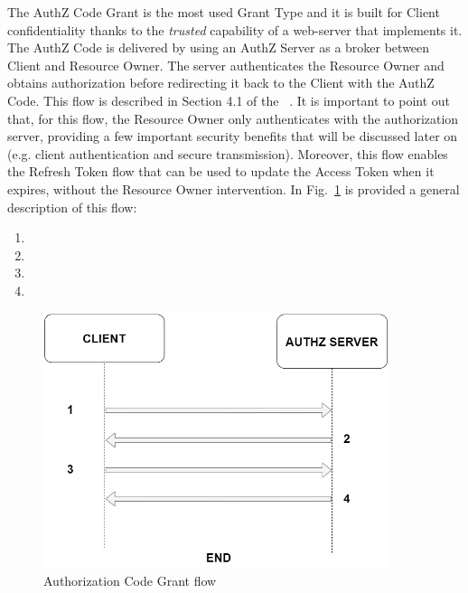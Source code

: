 The AuthZ Code Grant is the most used Grant Type and it is built for Client confidentiality thanks to the \textit{trusted} capability of a web-server that implements it. The AuthZ Code is delivered by using an AuthZ Server as a broker between Client and Resource Owner. The server authenticates the Resource Owner and obtains authorization before redirecting it back to the Client with the AuthZ Code. This flow is described in Section 4.1 of the \ \cite{RFC6749}. It is important to point out that, for this flow, the Resource Owner only authenticates with the authorization server, providing a few important security benefits that will be discussed later on (e.g. client authentication and secure transmission). Moreover, this flow enables the Refresh Token flow that can be used to update the Access Token when it expires, without the Resource Owner intervention. In Fig.~\ref{fig:serverflow} is provided a general description of this flow:

\begin{enumerate}
    \item 
    
    \item 
    
    \item 
    
    \item 
\end{enumerate}



\begin{figure}[htbp]
    \centering
    \includegraphics[width=0.9\textwidth]{chapters/images/chp2/server_flow_general.png}
    \caption{Authorization Code Grant flow}
    \label{fig:serverflow}
\end{figure}

